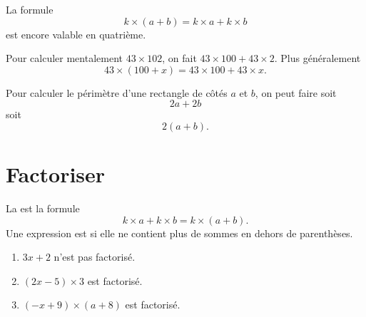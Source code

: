\begin{Aretenir}
    La formule
    \begin{equation}
        k\times (a+b)= k\times a+k\times b
    \end{equation}
    est encore valable en quatrième.
\end{Aretenir}

\begin{example}
    Pour calculer mentalement \( 43\times 102\), on fait \( 43\times 100+43\times 2\). Plus généralement
    \begin{equation}
        43\times (100+x)=43\times 100+43\times x.
    \end{equation}
\end{example}

\begin{example}
    Pour calculer le périmètre d'une rectangle de côtés \( a\) et \( b\), on peut faire soit
    \begin{equation}
        2a+2b
    \end{equation}
    soit
    \begin{equation}
        2(a+b).
    \end{equation}
\end{example}

\section{Factoriser}

\begin{Aretenir}
    La  est la formule
    \begin{equation}
        k\times a+k\times b=k\times (a+b).
    \end{equation}
    Une expression est  si elle ne contient plus de sommes en dehors de parenthèses.
\end{Aretenir}

\begin{example}
    \begin{enumerate}
        \item
            \( 3x+2\) n'est pas factorisé.
        \item
            \( (2x-5)\times 3\) est factorisé.
        \item
            \( (-x+9)\times (a+8)\) est factorisé.
    \end{enumerate}
\end{example}


